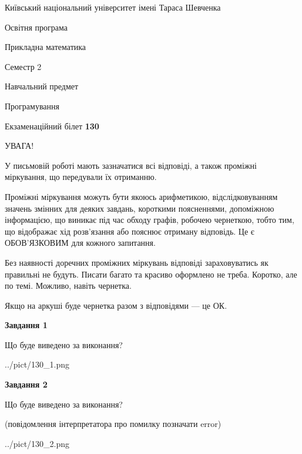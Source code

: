 \documentclass[12pt, ukrainian]{article}
\begin{document}
{{\begin {small}\par
{ \center  Київський національний університет імені Тараса Шевченка \par}
{\parbox {5 cm}{Освітня програма \hfill}{\parbox {7 cm}{Прикладна математика\hfill}}\parbox {6 cm}{\hfill Семестр 2}}\par
{\parbox {5 cm} {Навчальний предмет \hfill}\parbox {7 cm}{Програмування \hfill}\parbox {6cm}{\hfill}\par}\vspace{-7pt} \end{small}}{\center Екзаменаційний білет \No \textbf
{ 130 }\par}}
{
\begin {large}
УВАГА!

У письмовій роботі мають зазначатися всі відповіді, а також проміжні міркування, що передували їх отриманню.

Проміжні міркування можуть бути якоюсь арифметикою, відслідковуванням зна\-чень змінних для деяких завдань,
короткими поясненнями, допоміжною інформацією, що виникає під час обходу графів, робочею чернеткою,
тобто тим, що відображає хід розв’язання або пояснює отриману відповідь.
Це є ОБОВ’ЯЗКОВИМ для кожного запитання.

Без наявності доречних проміжних міркувань відповіді зараховуватись як правиль\-ні не будуть.
Писати багато та красиво оформлено не треба. Коротко, але по темі. Можли\-во, навіть чернетка.

Якщо на аркуші буде чернетка разом з відповідями --- це ОК.

\newpage

{\begin {center}\textbf{Завдання 1}\end {center}}\par
Що буде виведено за виконання?\par
\begin{center}
	{../pict/130_1.png}
\end{center}
\newpage

{\begin {center}\textbf{Завдання 2}\end {center}}\par
Що буде виведено за виконання?\par
 (повідомлення інтерпретатора про помилку позначати error)\par
\begin{center}
	{../pict/130_2.png}
\end{center}
\newpage


\end{large}}
\end{document}
